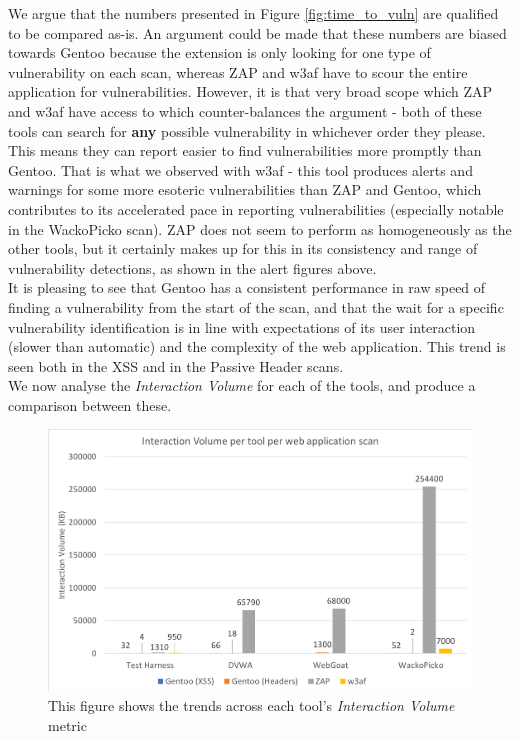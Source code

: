 We argue that the numbers presented in Figure \ref{fig:time_to_vuln} are qualified to be compared as-is. An argument could be made that these numbers are biased towards Gentoo because the extension is only looking for one type of vulnerability on each scan, whereas ZAP and w3af have to scour the entire application for vulnerabilities. However, it is that very broad scope which ZAP and w3af have access to which counter-balances the argument - both of these tools can search for \textbf{any} possible vulnerability in whichever order they please. This means they can report easier to find vulnerabilities more promptly than Gentoo. That is what we observed with w3af - this tool produces alerts and warnings for some more esoteric vulnerabilities than ZAP and Gentoo, which contributes to its accelerated pace in reporting vulnerabilities (especially notable in the WackoPicko scan). ZAP does not seem to perform as homogeneously as the other tools, but it certainly makes up for this in its consistency and range of vulnerability detections, as shown in the alert figures above. \\

It is pleasing to see that Gentoo has a consistent performance in raw speed of finding a vulnerability from the start of the scan, and that the wait for a specific vulnerability identification is in line with expectations of its user interaction (slower than automatic) and the complexity of the web application. This trend is seen both in the XSS and in the Passive Header scans. \\

We now analyse the \textit{Interaction Volume} for each of the tools, and produce a comparison between these. \\

\begin{figure}[h]
	\centering
	\includegraphics[width=\textwidth]{images/evaluation/interaction_to_volume.png}
	\caption{This figure shows the trends across each tool's \textit{Interaction Volume} metric}
	\label{fig:interaction_volume}
\end{figure}

